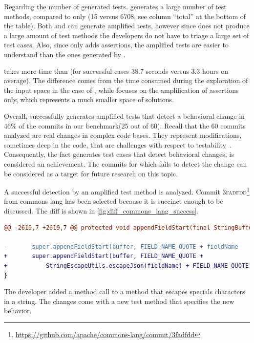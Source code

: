 Regarding the number of generated tests.
\DCII generates a large number of test methods, compared to \DCIA only (15 versus 6708, see column ``total'' at the bottom of the table). 
Both \DCIA and \DCII can generate amplified tests, however since \DCIA does not produce a large amount of test methods the developers do not have to triage a large set of test cases.
Also, since \DCIA only adds assertions, the amplified tests are easier to understand than the ones generated by \DCII.

\DCII takes more time than \DCIA (for successful cases 38.7 seconds versus 3.3 hours on average).
The difference comes from the time consumed during the exploration of the input space in the case of \DCII, while \DCIA focuses on the amplification of assertions only, which represents a much smaller space of solutions. 

Overall, \DCI successfully generates amplified tests that detect a behavioral change in 46\% of the commits in our benchmark(25 out of 60).
Recall that the 60 commits analyzed are real changes in complex code bases.
They represent modifications, sometimes deep in the code, that are challenges with respect to testability~\cite{voas1995software}.
Consequently, the fact \DCI generates test cases that detect behavioral changes, is considered an achievement.
The commits for which \DCI fails to detect the change can be considered as a target for future research on this topic.

A successful detection by an amplified test method is analyzed.
Commit \textsc{3fadfdd}\footnote{\url{https://github.com/apache/commons-lang/commit/3fadfdd}} from commons-lang has been selected because it is succinct enough to be discussed.
The diff is shown in \autoref{fig:diff_commons_lang_success}.

\begin{lstlisting}[language=diff,caption=Diff of commit \textsc{3fadfdd} from commons-lang.,label=fig:diff_commons_lang_success]
@@ -2619,7 +2619,7 @@ protected void appendFieldStart(final StringBuffer buffer, final String fieldNam

-       super.appendFieldStart(buffer, FIELD_NAME_QUOTE + fieldName
+       super.appendFieldStart(buffer, FIELD_NAME_QUOTE +
+           StringEscapeUtils.escapeJson(fieldName) + FIELD_NAME_QUOTE);
}
\end{lstlisting}

The developer added a method call to a method that escapes specials characters in a string. 
The changes come with a new test method that specifies the new behavior.

